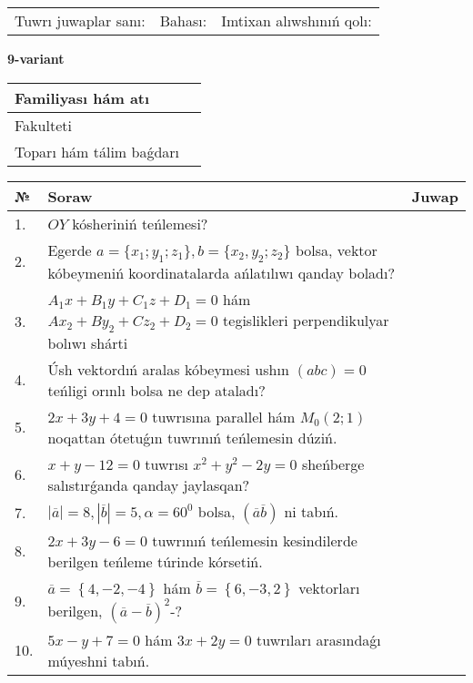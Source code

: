\documentclass{article}
\begin{document}
\vspace{1cm}

\begin{tabular}{lll}
Tuwrı juwaplar sanı: \underline{\hspace{1.5cm}} & 
Bahası: \underline{\hspace{1.5cm}} & 
Imtixan alıwshınıń qolı: \underline{\hspace{2cm}} \\
\end{tabular}

\egroup

\newpage


\textbf{9-variant}\\

\bgroup
\def\arraystretch{1.6} %

\begin{tabular}{|m{5.7cm}|m{9.5cm}|}
\hline
Familiyası hám atı & \\
\hline
Fakulteti  & \\
\hline
Toparı hám tálim baǵdarı  & \\
\hline
\end{tabular}

\vspace{1cm}

\begin{tabular}{|m{0.7cm}|m{10cm}|m{4cm}|}
\hline
№ & Soraw & Juwap \\
\hline
1. & $OY$ kósheriniń teńlemesi? &  \\
\hline
2. & Egerde $a=\{ x_1; y_1; z_1\}, b=\{ x_2, y_2; z_2\}$ bolsa, vektor kóbeymeniń koordinatalarda ańlatılıwı qanday boladı? &  \\
\hline
3. & $A_1x+B_1y+C_1z+D_1=0$ hám $Ax_2+By_2+Cz_2+D_2=0$ tegislikleri perpendikulyar bolıwı shárti &  \\
\hline
4. & Úsh vektordıń aralas kóbeymesi ushın $(abc)=0$ teńligi orınlı bolsa ne dep ataladı? &  \\
\hline
5. & $2x+3y+4=0$ tuwrısına parallel hám $M_{0} (2;1)$ noqattan ótetuǵın tuwrınıń teńlemesin dúziń. &  \\
\hline
6. & $x+y-12=0$ tuwrısı $x^{2}+y^{2}-2y=0$ sheńberge salıstırǵanda qanday jaylasqan? &  \\
\hline
7. & $\left| \overline{a} \right|=8, \left| \overline{b} \right|=5, \alpha=60^{0}$ bolsa, $( \overline{a}\overline{b} )$ ni tabıń. &  \\
\hline
8. & $2x+3y-6=0$ tuwrınıń teńlemesin kesindilerde berilgen teńleme túrinde kórsetiń. &  \\
\hline
9. & $\overline{a}=\left\{ 4,-2,-4 \right\}$ hám $\overline{b}=\left\{ 6,-3, 2 \right\}$ vektorları berilgen, $(\overline{a}-\overline{b}) ^{2}$-? &  \\
\hline
10. & $5x-y+7=0$ hám $3x+2y=0$ tuwrıları arasındaǵı múyeshni tabıń. &  \\
\hline
\end{tabular}
\end{document}
